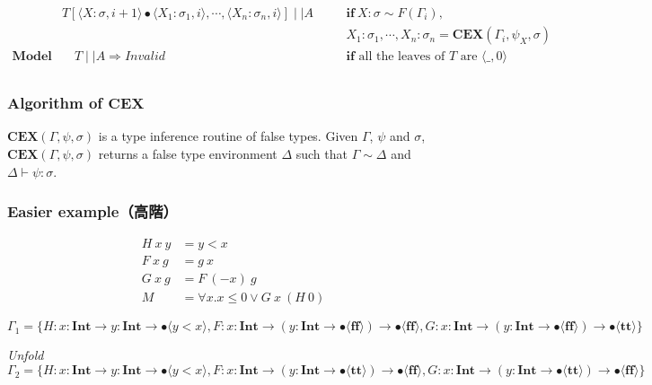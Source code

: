 \documentclass[runningheads]{llncs}
\newcommand\COL{\mathbin{:}}
\newcommand \true {\textbf{tt}}
\newcommand \false {\textbf{ff}}
\newcommand \stypeint {\textbf{Int}}
\newcommand \stypebool {\bullet}
\newcommand \typeint[1]{{#1} : \stypeint}
\newcommand \typebool[1]{\stypebool \langle #1 \rangle}
\newcommand {\runfold} {\emph{Unfold}}
\newcommand {\fenv} {\Delta} %
\newcommand {\consistent}{\sim}
\begin{document}
\begin{align*}
        &  T[\langle X: \sigma, i + 1 \rangle
                \bullet \langle X_1 \COL \sigma_1, i\rangle, \cdots,
                        \langle X_n \COL \sigma_n, i\rangle]
        \mid \mid A
        &&\quad \textbf{if} \ X \COL \sigma \consistent F(\Gamma_i),\\
        &&&\quad  X_1 \COL \sigma_1, \cdots, X_n \COL \sigma_n=
        \textbf{CEX}(\Gamma_i, \psi_X, \sigma)
        \\
    \textbf{Model} &\quad
        T \mid \mid A \Rightarrow Invalid
        &&\quad \textbf{if} \text{ all the leaves of } T \text{ are } \langle \_, 0 \rangle \
        \\
\end{align*}




\subsubsection{Algorithm of \( \mathbf{CEX} \)}

\( \textbf{CEX}(\Gamma, \psi, \sigma) \) is a type inference routine of false types.
Given \( \Gamma \), \( \psi \) and \( \sigma \),
\( \textbf{CEX}(\Gamma, \psi, \sigma) \) returns a false type environment \( \fenv \) such that
\( \Gamma \sim \fenv \) and \( \fenv \vdash \psi \COL \sigma \).





\subsubsection{Easier example（高階）}

\begin{align*}
    H\ x\ y &= y < x \\
    F\ x\ g &= g\ x\\
    G\ x\ g &= F\ (-x)\ g\\
    M &= \forall x. x \leq 0 \lor G\ x\ (H\ 0)
\end{align*}

\( \Gamma_1 =
\{ H \COL \typeint{x} \to \typeint{y} \to \typebool{y < x},
F \COL \typeint{x} \to (\typeint{y} \to \typebool{\false}) \to \typebool{\false},
G \COL \typeint{x} \to (\typeint{y} \to \typebool{\false}) \to \typebool{\true}
\}
\)

\runfold{}
\(
\Gamma_2 = \{ H \COL \typeint{x} \to \typeint{y} \to \typebool{y < x},
F \COL \typeint{x} \to (\typeint{y} \to \typebool{\true}) \to \typebool{\false},
G \COL \typeint{x} \to (\typeint{y} \to \typebool{\true}) \to \typebool{\false}
\}
\)
\end{document}
